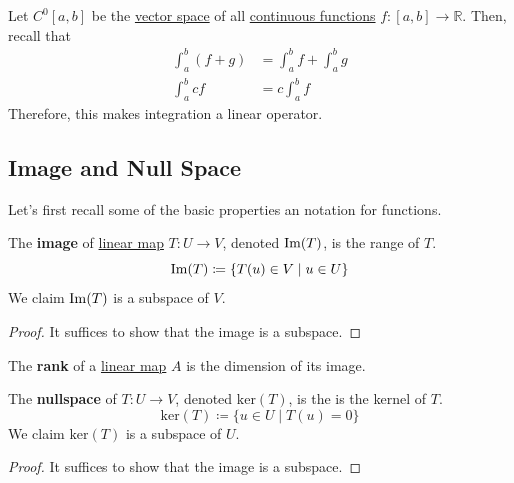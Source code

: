 	\begin{example}[Integration]
	  \label{ex:integration}
		Let $C^0 [a, b]$ be the \hyperref[def:vector-space]{vector space} of all \hyperref[pst-def:continuous_func]{continuous functions} $f: [a, b] \to \mathbb{R}$. Then, recall that 
		\begin{align}
			\int_a^b (f + g) & = \int_a^b f + \int_a^b g \\ 
			\int_a^b cf & = c \int_a^b f
		\end{align}
		Therefore, this makes integration a linear operator. 
	\end{example}

\subsection{Image and Null Space}

  Let's first recall some of the basic properties an notation for functions. 

  \begin{definition}[Image]
    \label{def:image}
    The \textbf{image} of \hyperref[def:linear_map]{linear map} $T: U \to V$, denoted $\operatorname{Im}(T)$, is the range of $T$. 
    \begin{equation}
      \operatorname{Im}(T) \coloneqq \{T(u) \in V \mid u \in U\}
    \end{equation}
    We claim $\operatorname{Im}(T)$ is a subspace of $V$. 
  \end{definition}
  \begin{proof}
    It suffices to show that the image is a subspace. 
  \end{proof}

  \begin{definition}[Rank]
    \label{def:rank}
    The \textbf{rank} of a \hyperref[def:linear_map]{linear map} $A$ is the dimension of its image. 
  \end{definition}

  \begin{definition}
    \label{def:nullspace-kernel}
    The \textbf{nullspace} of $T: U \to V$, denoted $\mathrm{ker}(T)$, is the 
    is the kernel of $T$. 
    \begin{equation}
      \mathrm{ker}(T) \coloneqq \{ u \in U \mid T(u) = 0\}
    \end{equation}
    We claim $\mathrm{ker}(T)$ is a subspace of $U$. 
  \end{definition}
  \begin{proof}
    It suffices to show that the image is a subspace. 
  \end{proof}


